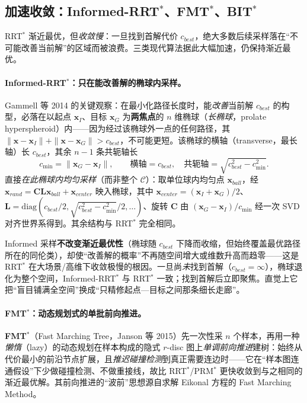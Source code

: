 \subsection{加速收敛：Informed-RRT$^*$、FMT$^*$、BIT$^*$}
\label{sec:plan-informed}

RRT$^*$ 渐近最优，但\emph{收敛慢}：一旦找到首解代价 $c_{best}$，绝大多数后续采样落在“不可能改善当前解”的区域而被浪费。三类现代算法据此大幅加速，仍保持渐近最优。

\paragraph{Informed-RRT$^*$：只在能改善解的椭球内采样。}
Gammell 等 2014\cite{gammell2014informed} 的关键观察：在最小化路径长度时，能\emph{改善}当前解 $c_{best}$ 的构型，必落在以起点 $\mathbf{x}_I$、目标 $\mathbf{x}_G$ 为\textbf{两焦点}的 $n$ 维椭球（\emph{长椭球}，prolate hyperspheroid）内——因为经过该椭球外一点的任何路径，其 $\|\mathbf{x}-\mathbf{x}_I\|+\|\mathbf{x}-\mathbf{x}_G\|>c_{best}$，不可能更短。该椭球的横轴（transverse，最长轴）长 $c_{best}$，其余 $n-1$ 条共轭轴长
\begin{equation}
  c_{\min}=\|\mathbf{x}_G-\mathbf{x}_I\|,\qquad
  \text{横轴}=c_{best},\quad\text{共轭轴}=\sqrt{c_{best}^2-c_{\min}^2}.
  \label{eq:plan-informed-axes}
\end{equation}
直接\emph{在此椭球内均匀采样}（而非整个 $\mathcal{C}$）：取单位球内均匀点 $\mathbf{x}_{ball}$，经 $\mathbf{x}_{rand}=\mathbf{C}\mathbf{L}\mathbf{x}_{ball}+\mathbf{x}_{center}$ 映入椭球，其中 $\mathbf{x}_{center}=(\mathbf{x}_I+\mathbf{x}_G)/2$、$\mathbf{L}=\mathrm{diag}(c_{best}/2,\sqrt{c_{best}^2-c_{\min}^2}/2,\dots)$、旋转 $\mathbf{C}$ 由 $(\mathbf{x}_G-\mathbf{x}_I)/c_{\min}$ 经一次 SVD 对齐世界系得到。其余结构与 RRT$^*$ 完全相同。

\begin{insight}
Informed 采样\textbf{不改变渐近最优性}（椭球随 $c_{best}$ 下降而收缩，但始终覆盖最优路径所在的同伦类），却使“改善解的概率”不再随空间增大或维数升高而趋零——这是 RRT$^*$ 在大场景/高维下收敛极慢的根因。一旦尚\emph{未}找到首解（$c_{best}=\infty$），椭球退化为整个空间，Informed-RRT$^*$ 与 RRT$^*$ 一致；找到首解后立即聚焦。直觉上它把“盲目铺满全空间”换成“只精修起点—目标之间那条细长走廊”。
\end{insight}

\paragraph{FMT$^*$：动态规划式的单批前向推进。}
\textbf{FMT$^*$}（Fast Marching Tree，Janson 等 2015\cite{janson2015fmt}）先一次性采 $n$ 个样本，再用一种\emph{懒惰}（lazy）的动态规划在样本构成的隐式 $r$-disc 图上\emph{单调前向推进}建树：始终从代价最小的前沿节点扩展，且\emph{推迟碰撞检测}到真正需要连边时——它在“样本图连通假设”下少做碰撞检测、不做重接线，故比 RRT$^*$/PRM$^*$ 更快收敛到与之相同的渐近最优解。其前向推进的“波前”思想源自求解 Eikonal 方程的 Fast Marching Method。

